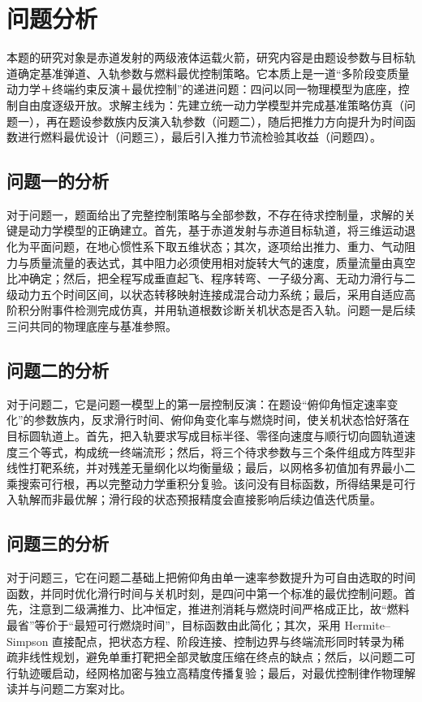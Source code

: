 \documentclass[withoutpreface,bwprint]{cumcmthesis}
\begin{document}
\section{问题分析}

本题的研究对象是赤道发射的两级液体运载火箭，研究内容是由题设参数与目标轨道确定基准弹道、入轨参数与燃料最优控制策略。它本质上是一道“多阶段变质量动力学＋终端约束反演＋最优控制”的递进问题：四问以同一物理模型为底座，控制自由度逐级开放。求解主线为：先建立统一动力学模型并完成基准策略仿真（问题一），再在题设参数族内反演入轨参数（问题二），随后把推力方向提升为时间函数进行燃料最优设计（问题三），最后引入推力节流检验其收益（问题四）。

\subsection{问题一的分析}
对于问题一，题面给出了完整控制策略与全部参数，不存在待求控制量，求解的关键是动力学模型的正确建立。首先，基于赤道发射与赤道目标轨道，将三维运动退化为平面问题，在地心惯性系下取五维状态；其次，逐项给出推力、重力、气动阻力与质量流量的表达式，其中阻力必须使用相对旋转大气的速度，质量流量由真空比冲确定；然后，把全程写成垂直起飞、程序转弯、一子级分离、无动力滑行与二级动力五个时间区间，以状态转移映射连接成混合动力系统；最后，采用自适应高阶积分附事件检测完成仿真，并用轨道根数诊断关机状态是否入轨。问题一是后续三问共同的物理底座与基准参照。

\subsection{问题二的分析}
对于问题二，它是问题一模型上的第一层控制反演：在题设“俯仰角恒定速率变化”的参数族内，反求滑行时间、俯仰角变化率与燃烧时间，使关机状态恰好落在目标圆轨道上。首先，把入轨要求写成目标半径、零径向速度与顺行切向圆轨道速度三个等式，构成统一终端流形；然后，将三个待求参数与三个条件组成方阵型非线性打靶系统，并对残差无量纲化以均衡量级；最后，以网格多初值加有界最小二乘搜索可行根，再以完整动力学重积分复验。该问没有目标函数，所得结果是可行入轨解而非最优解；滑行段的状态预报精度会直接影响后续边值迭代质量\cite{hu2023}。

\subsection{问题三的分析}
对于问题三，它在问题二基础上把俯仰角由单一速率参数提升为可自由选取的时间函数，并同时优化滑行时间与关机时刻，是四问中第一个标准的最优控制问题。首先，注意到二级满推力、比冲恒定，推进剂消耗与燃烧时间严格成正比，故“燃料最省”等价于“最短可行燃烧时间”，目标函数由此简化；其次，采用 Hermite--Simpson 直接配点，把状态方程、阶段连接、控制边界与终端流形同时转录为稀疏非线性规划，避免单重打靶把全部灵敏度压缩在终点的缺点\cite{betts1998}；然后，以问题二可行轨迹暖启动，经网格加密与独立高精度传播复验；最后，对最优控制律作物理解读并与问题二方案对比。
\end{document}
